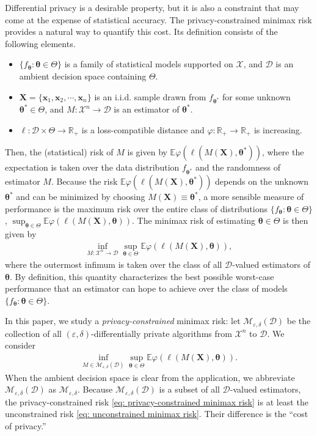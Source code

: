 \documentclass[letterpaper,12pt]{article}
\numberwithin{equation}{section}
\theoremstyle{plain}
\numberwithin{Theorem}{section}
\numberwithin{proposition}{section}
\numberwithin{Lemma}{section}
{
	\theoremstyle{definition}
	\newtheorem{Definition}{Definition}
	\newtheorem{example}{Example}
	\numberwithin{example}{section}
	\newtheorem{fact}{Fact}
	\numberwithin{fact}{section}
	\newtheorem{remark}{Remark}
}
\newcommand{\furtherrev}[1]{#1}
\newcommand{\1}{\mathbbm{1}}
\def\bth{{\boldsymbol{\theta}}}
\def\R{{\mathbb R}}
\def\E{\mathbb{E}}
\begin{document}
Differential privacy is a desirable property, but it is also a constraint that may come at the expense of statistical accuracy. The privacy-constrained minimax risk provides a natural way to quantify this cost. Its definition consists of the following elements.
\begin{itemize}
	\item $\{f_\bth: \bth \in \Theta\}$ is a family of statistical models supported on $\mathcal X$, and \furtherrev{$\mathcal D$ is an ambient decision space containing $\Theta$}.
	\item $\bm X = \{\bm x_1, \bm x_2, \cdots, \bm x_n\}$ is an i.i.d. sample drawn from $f_{\bth^*}$ for some unknown $\bth^* \in \Theta$, and \furtherrev{$M: \mathcal X^n \to \mathcal D$} is an estimator of $\bth^*$.
	\item \furtherrev{$\ell: \mathcal D \times \Theta \to \R_{+}$ is a loss-compatible distance and $\varphi: \R_{+} \to \R_{+}$ is increasing.}
\end{itemize} 
Then, the (statistical) risk of $M$ is given by \furtherrev{$\E\varphi(\ell(M(\bm X), \bth^*))$}, where the expectation is taken over the data distribution $f_{\bth^*}$ and the randomness of estimator $M$. Because the risk \furtherrev{$\E\varphi(\ell(M(\bm X), \bth^*))$} depends on the unknown $\bth^*$ and can be minimized by choosing $M(\bm X) \equiv \bth^*$, a more sensible measure of performance is the maximum risk over the entire class of distributions $\{f_\bth: \bth \in \Theta\}$, \furtherrev{$\sup_{\bth \in \Theta} \E\varphi(\ell(M(\bm X), \bth))$}.
The minimax risk of estimating $\bth \in \Theta$ is then given by
\begin{align} \label{eq: unconstrained minimax risk}
	\inf_{\furtherrev{M:\mathcal X^n\to\mathcal D}} \sup_{\bth \in \Theta} \E\furtherrev{\varphi}(\ell(M(\bm X), \bth)),
\end{align}
where the outermost infimum is taken over the class of all \furtherrev{$\mathcal D$-valued} estimators of $\bth$. By definition, this quantity characterizes the best possible worst-case performance that an estimator can hope to achieve over the class of models $\{f_\bth: \bth \in \Theta\}$.

In this paper, we study a \textit{privacy-constrained} minimax risk: \furtherrev{let $\mathcal M_{\varepsilon,\delta}(\mathcal D)$ be the collection of all $(\varepsilon,\delta)$-differentially private algorithms from $\mathcal X^n$ to $\mathcal D$}. We consider
\begin{align}\label{eq: privacy-constrained minimax risk}
	\inf_{M \in \furtherrev{\mathcal M_{\varepsilon, \delta}(\mathcal D)}} \sup_{\bth \in \Theta} \E\furtherrev{\varphi}(\ell(M(\bm X), \bth)).
\end{align}
\furtherrev{When the ambient decision space is clear from the application, we abbreviate $\mathcal M_{\varepsilon,\delta}(\mathcal D)$ as $\mathcal M_{\varepsilon,\delta}$.} Because $\mathcal M_{\varepsilon,\delta}(\mathcal D)$ is a subset of all \furtherrev{$\mathcal D$-valued} estimators, the privacy-constrained risk \eqref{eq: privacy-constrained minimax risk} is at least the unconstrained risk \eqref{eq: unconstrained minimax risk}. Their difference is the ``cost of privacy.''
\end{document}
